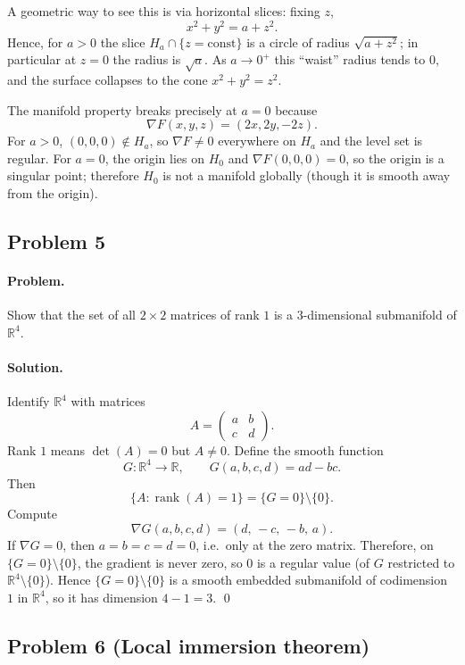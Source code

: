 \documentclass[12pt,a4paper]{article}
\theoremstyle{plain}
\theoremstyle{definition}      %
\begin{document}
A geometric way to see this is via horizontal slices: fixing $z$,
\[
x^2+y^2 = a+z^2.
\]
Hence, for $a>0$ the slice $H_a\cap\{z=\mathrm{const}\}$ is a circle of radius $\sqrt{a+z^2}$;
in particular at $z=0$ the radius is $\sqrt{a}$. As $a\to 0^+$ this ``waist'' radius tends to $0$,
and the surface collapses to the cone $x^2+y^2=z^2$.

The manifold property breaks precisely at $a=0$ because
\[
\nabla F(x,y,z)=(2x,2y,-2z).
\]
For $a>0$, $(0,0,0)\notin H_a$, so $\nabla F\neq 0$ everywhere on $H_a$ and the level set is regular.
For $a=0$, the origin lies on $H_0$ and $\nabla F(0,0,0)=0$, so the origin is a singular point;
therefore $H_0$ is not a manifold globally (though it is smooth away from the origin).


\subsection*{Problem 5}
\paragraph{Problem.}
Show that the set of all $2\times 2$ matrices of rank $1$ is a $3$-dimensional submanifold of $\mathbb{R}^4$.

\paragraph{Solution.}
Identify $\mathbb{R}^4$ with matrices
\[
A=\begin{pmatrix}a&b\\ c&d\end{pmatrix}.
\]
Rank $1$ means $\det(A)=0$ but $A\neq 0$. Define the smooth function
\[
G:\mathbb{R}^4\to\mathbb{R},\qquad G(a,b,c,d)=ad-bc.
\]
Then
\[
\{A:\operatorname{rank}(A)=1\}=\{G=0\}\setminus\{0\}.
\]
Compute
\[
\nabla G(a,b,c,d)=(d,\,-c,\,-b,\,a).
\]
If $\nabla G=0$, then $a=b=c=d=0$, i.e.\ only at the zero matrix.
Therefore, on $\{G=0\}\setminus\{0\}$, the gradient is never zero, so $0$ is a regular value
(of $G$ restricted to $\mathbb{R}^4\setminus\{0\}$). Hence $\{G=0\}\setminus\{0\}$ is a smooth
embedded submanifold of codimension $1$ in $\mathbb{R}^4$, so it has dimension $4-1=3$.
\qed

\subsection*{Problem 6 (Local immersion theorem)}
\end{document}
